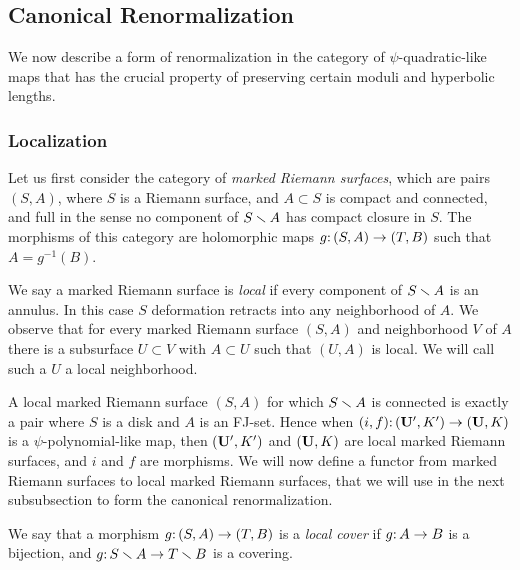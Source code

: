 \newcommand{\hl}[1]{\hat #1}
\subsection{Canonical Renormalization}\label{can renorm}
We now describe a form of renormalization in the category of $\psi$-quadratic-like maps
that has the crucial property of preserving certain moduli and hyperbolic lengths. 

\subsubsection{Localization}
Let us first consider the category of \emph{marked Riemann surfaces}, 
which are pairs $(S, A)$, where $S$ is a Riemann surface,
and $A \subset S$ is compact and connected, 
and full in the sense no component of $S \smallsetminus A$ has compact closure in $S$. 
The morphisms of this category are holomorphic maps $g\mathpunct: (S, A) \to (T, B)$ such that $A=g^{-1}(B)$. 

We say a marked Riemann surface is \emph{local} if every component of $S \smallsetminus A$ is an annulus. 
In this case $S$ deformation retracts into any neighborhood of $A$.
We observe that for every marked Riemann surface $(S, A)$ and neighborhood $V$ of $A$ there is a subsurface $U \subset V$ with $A \subset U$ such that $(U, A)$ is local. 
We will call such a $U$ a local neighborhood. 

A local marked Riemann surface $(S, A)$ for which $S \smallsetminus A$ is connected
is exactly a pair where $S$ is a disk and $A$ is an FJ-set.
Hence when $(i, f)\mathpunct: (\mathbf U', K') \to (\mathbf U, K)$ is a $\psi$-polynomial-like map, 
then  $(\mathbf U', K')$ and  $(\mathbf U, K)$ are local marked Riemann surfaces, and $i$ and $f$ are morphisms. 
We will now define a functor from marked Riemann surfaces to local marked Riemann surfaces, 
that we will use in the next subsubsection to form the canonical renormalization.

We say that a morphism $g\mathpunct: (S, A) \to (T, B)$
is a \emph{local cover} if $g\mathpunct: A \to B$ is a bijection, and $g\mathpunct: S \smallsetminus A \to T \smallsetminus B$ is a covering. 

